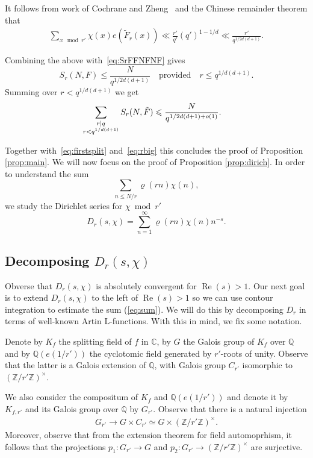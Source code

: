 \documentclass[12pt]{amsart}
\def\C{{\mathbb C}}
\def\Q{{\mathbb Q}}
\def\Z{{\mathbb Z}}
\def\\{\cr}
\def\le{\leqslant}
\begin{document}
It follows from work of Cochrane and Zheng~\cite{CZ} and the Chinese remainder theorem that 
\begin{align*}
\sum_{x\mod{r'}}\chi(x)e(\tilde F_r(x))\ll \frac{r'}{q'}(q')^{1-1/d}\ll \frac{r'}{q^{1/2d(d+1)}}.
\end{align*}

Combining the above with~\eqref{eq:SrFFNFNF} gives 
\begin{equation*}
S_r(N, F) \le \frac{N}{q^{1/2d(d+1)}} \quad \text{provided} \quad r\le q^{1/d(d+1)}.
\end{equation*}
Summing over $r < q^{1/d(d+1)}$ we get
\begin{align*}
\sum_{\substack{r|q \\ r < q^{1/d(d+1)}}} S_r(N,\tilde{F}) & \le \frac{N}{q^{1/2d(d+1)+o(1)}}.
\end{align*}


Together with~\eqref{eq:firstsplit} and~\eqref{eq:rbig} this concludes the proof of Proposition \ref{prop:main}. We will now focus on the proof of Proposition \ref{prop:dirich}. 
In order to understand the sum
\begin{equation}
\label{eq:sum}
\sum_{n \le N/r} \varrho(rn)\chi(n),
\end{equation} we study the Dirichlet series for $\chi \bmod{r'}$
\begin{equation*}
D_r(s, \chi ) = \sum_{n = 1}^\infty \varrho(rn)\chi(n) n^{-s}.
\end{equation*}

\subsection{Decomposing $D_r(s,\chi)$}
Obverse that $D_r(s,\chi)$ is absolutely convergent for $\operatorname{Re}(s) >1$.
Our next goal is to extend $D_r(s,\chi)$ to the left of $\operatorname{Re}(s) > 1$ so we can use contour integration to estimate the sum (\ref{eq:sum}).  We will do this by decomposing $D_r$ in terms of well-known Artin L-functions. With this in mind, we fix some notation.

 Denote by $K_f$ the splitting field of $f$ in $\C$, by $G$ the Galois group of $K_f$ over $\Q$ and by $\Q(e(1/r'))$ the cyclotomic field generated by $r'$-roots of unity. Observe that the latter is a Galois extension of $\Q$, with Galois group $C_{r'}$ isomorphic to $(\Z/r'\Z)^{\times}$.

We also consider the compositum of $K_f$ and $\Q(e(1/r'))$ and denote it by $K_{f,r'}$ and its Galois group over $\Q$ by $G_{r'}$.  Observe that there is a natural injection
\begin{align*}
G_{r'} \rightarrow G \times C_{r'} \simeq G \times (\Z/r'\Z)^\times.
\end{align*}
Moreover, observe that from the extension theorem for field automoprhism, it follows that the projections $p_1: G_{r'} \rightarrow G$ and $p_2: G_{r'} \rightarrow (\Z/r'\Z)^\times$ are surjective.
\end{document}
